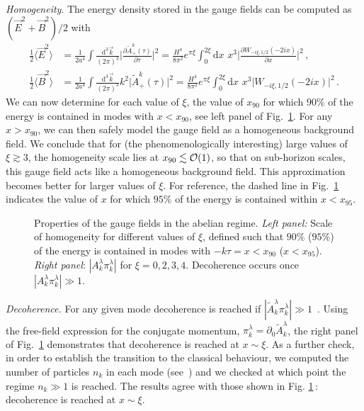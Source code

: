 \textit{Homogeneity}. The energy density stored in the gauge fields can be computed as  $(\vec E^2 + \vec B^2)/2$ with
\begin{align}
 \frac{1}{2} \langle \vec E^2 \rangle & = \frac{1}{2 a^4} \int \frac{\textrm{d}^3 \vec{k}}{(2 \pi)^3} \bigg|\frac{\partial \tilde{A}_+^k(\tau)}{\partial \tau}\bigg|^2  = \frac{H^4}{8 \pi^2}e^{\pi \xi} \int_0^{2 \xi} \textrm{d} x \,\,x^3 \bigg| \frac{\partial W_{-i \xi, 1/2}(- 2 i x)}{\partial x} \bigg|^2 \,,\\
  \frac{1}{2} \langle \vec B^2 \rangle & = \frac{1}{2 a^4} \int \frac{\textrm{d}^3 \vec{k}}{(2 \pi)^3} k^2 \bigg|\tilde{A}_+^k(\tau)\bigg|^2  = \frac{H^4}{8 \pi^2}e^{\pi \xi} \int_0^{2 \xi} \textrm{d} x \,\,x^3 \bigg|  W_{-i \xi, 1/2}(- 2 i x)\bigg|^2 \,.
\end{align}
We can now determine for each value of $\xi$, the value of $x_{90}$ for which $90\%$ of the energy is contained in modes with $x < x_{90}$, see  left panel of Fig.~\ref{fig:propertiesabelian}. For any $x > x_{90}$, we can then safely model the gauge field as a homogeneous background field. We conclude that for (the phenomenologically interesting) large values of $\xi \gtrsim 3$, the homogeneity scale lies at $x_{90} \lesssim {\cal O}(1)$, so that on sub-horizon scales, this gauge field acts like a homogeneous background field. This approximation becomes better for larger values of $\xi$. For reference, the dashed line in Fig.~\ref{fig:propertiesabelian} indicates the value of $x$ for which $95\%$ of the energy is contained within $x < x_{95}$. 
\begin{figure}
\hfill
{}
\caption{Properties of the gauge fields in the abelian regime. \textit{Left panel:} Scale of homogeneity for different values of $\xi$, defined such that $90\%$ ($95\%$) of the energy is contained in modes with $- k \tau = x < x_{90}$ ($x < x_{95}$). \textit{Right panel}: $|A^\lambda_k \pi^\lambda_k|$ for $\xi = 0, 2, 3, 4$. Decoherence occurs once $|A^\lambda_k \pi^\lambda_k| \gg 1$.}
  \label{fig:propertiesabelian}
\end{figure}

\textit{Decoherence.} For any given mode decoherence is reached if $|\tilde{A}^\lambda_k \pi^\lambda_k| \gg 1$~\cite{Guth:1985ya}. Using the free-field expression for the conjugate momentum, $\pi^\lambda_k = \partial_0 \tilde{A}^\lambda_k$, the right panel of Fig.~\ref{fig:propertiesabelian} demonstrates that decoherence is reached at $x \sim \xi$. As a further check, in order to establish the transition to the classical behaviour, we computed the number of particles $n_k$ in each mode (see~\cite{Brax:2010ai}) and we checked at which point the regime $n_k \gg 1$ is reached. The results agree with those shown in Fig. \ref{fig:propertiesabelian}\,: decoherence is reached at $x \sim \xi$.


